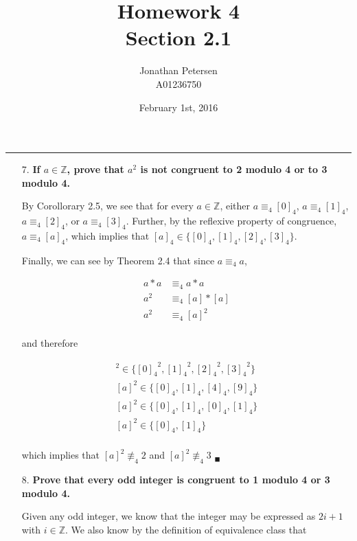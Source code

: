 \documentclass{article}
\title{Homework 4 \\ Section 2.1}
\author{Jonathan Petersen \\ A01236750}
\date{February 1st, 2016}
\begin{document}
	\maketitle
	\hrule
	\begin{enumerate}
		\item [7.]	\textbf{If $a \in \mathbb{Z}$, prove that $a^2$ is not congruent to 2 modulo 4
					or to 3 modulo 4.}

			By Corollorary 2.5, we see that for every $a \in \mathbb{Z}$, either $a \equiv_4 [0]_4$,
			$a \equiv_4 [1]_4$, $a \equiv_4 [2]_4$, or $a \equiv_4 [3]_4$. Further, by the reflexive
			property of congruence, $a \equiv_4 [a]_4$, which implies that $[a]_4 \in \lbrace [0]_4,
		 	[1]_4, [2]_4, [3]_4 \rbrace$.

		 	Finally, we can see by Theorem 2.4 that since $a \equiv_4 a$,

		 		\begin{align*}
		 			a * a & \equiv_4 a * a \\
		 			a^2 & \equiv_4 [a] * [a] \\
		 			a^2 & \equiv_4 [a]^2 \\
		 		\end{align*}

		 	and therefore 

		 		\begin{align*}
		 			[a]^2 \in \lbrace {[0]_4}^2, {[1]_4}^2, {[2]_4}^2, {[3]_4}^2 \rbrace \\
		 			[a]^2 \in \lbrace [0]_4, [1]_4, [4]_4, [9]_4 \rbrace \\ 
		 			[a]^2 \in \lbrace [0]_4, [1]_4, [0]_4, [1]_4 \rbrace \\
		 			[a]^2 \in \lbrace [0]_4, [1]_4 \rbrace \\
		 		\end{align*}

		 	which implies that $[a]^2 \not\equiv_4 2$ and $[a]^2 \not\equiv_4 3$ $_{\blacksquare}$

		\item [8.]	\textbf{Prove that every odd integer is congruent to 1 modulo 4 or 3 modulo 4.}

			Given any odd integer, we know that the integer may be expressed as $2i + 1$ with $i \in
			\mathbb{Z}$. We also know by the definition of equivalence class that 


\end{enumerate}
\end{document}
